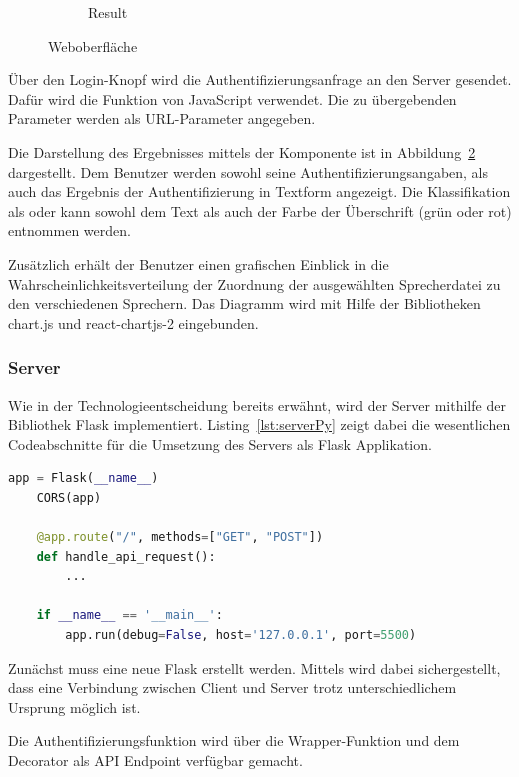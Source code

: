 \begin{figure}[H]
\begin{subfigure}[c]{0.49\textwidth}
        \caption{Result}
        \label{fig:Result}
    \end{subfigure}
    \caption{Weboberfläche}
\end{figure}
Über den Login-Knopf wird die Authentifizierungsanfrage an den Server gesendet.
Dafür wird die  Funktion von JavaScript verwendet.
Die zu übergebenden Parameter werden als URL-Parameter angegeben.

Die Darstellung des Ergebnisses mittels der  Komponente ist in Abbildung~\ref{fig:Result} dargestellt.
Dem Benutzer werden sowohl seine Authentifizierungsangaben, als auch das Ergebnis der Authentifizierung in Textform angezeigt.
Die Klassifikation als  oder  kann sowohl dem Text als auch der Farbe der Überschrift (grün oder rot) entnommen werden.

Zusätzlich erhält der Benutzer einen grafischen Einblick in die Wahrscheinlichkeitsverteilung der Zuordnung der ausgewählten Sprecherdatei zu den verschiedenen Sprechern.
Das Diagramm wird mit Hilfe der Bibliotheken chart.js und react-chartjs-2 eingebunden.

\subsubsection{Server} 
Wie in der Technologieentscheidung bereits erwähnt, wird der Server mithilfe der Bibliothek Flask implementiert.
Listing~\ref{lst:serverPy} zeigt dabei die wesentlichen Codeabschnitte für die Umsetzung des Servers als Flask Applikation.
\begin{lstlisting}[language=Python,numbers=none,caption=Ausschnitt server.py,label=lst:serverPy]
    app = Flask(__name__)
    CORS(app)

    @app.route("/", methods=["GET", "POST"])
    def handle_api_request():
        ...

    if __name__ == '__main__':
        app.run(debug=False, host='127.0.0.1', port=5500)
\end{lstlisting}
Zunächst muss eine neue Flask  erstellt werden.
Mittels  wird dabei sichergestellt, dass eine Verbindung zwischen Client und Server trotz unterschiedlichem Ursprung möglich ist.

Die Authentifizierungsfunktion wird über die Wrapper-Funktion  und dem Decorator  als \ac{API} Endpoint verfügbar gemacht.

